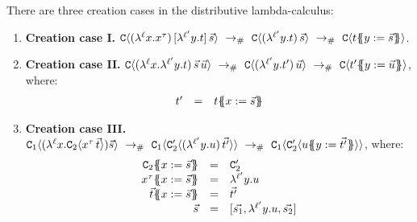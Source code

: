 \begin{lemma}[Creation]
There are three creation cases in the distributive lambda-calculus:
\begin{enumerate}
\item {\bf Creation case I.}
  $
    \con\of{ (\lamp{\lab}{\var}{\var^{\typ}})\,[\lamp{\labtwo}{\vartwo}{\tm}]\, \ls{\tmtwo}}
    \ \todist\ %
    \con\of{ (\lamp{\labtwo}{\vartwo}{\tm})\,\ls{\tmtwo} }
    \ \todist\ %
    \con\of{ \tm\sub{\vartwo}{\ls{\tmtwo}} }
  $.
\item {\bf Creation case II.}
  $
     \con\of{ (\lamp{\lab}{\var}{ \lamp{\labtwo}{\vartwo}{\tm} })\,\ls{\tmtwo}\,\ls{\tmthree} }
     \ \todist\ %
     \con\of{ (\lamp{\labtwo}{\vartwo}{\tm'})\,\ls{\tmthree} }
     \ \todist\ %
     \con\of{ \tm'\sub{\vartwo}{\ls{\tmthree}} }
  $, where:
  \[
     \begin{array}{rcl}
     t' & = & t\{\!\!\{x := \vec{s}\}\!\!\}
     \end{array}
  \]
\item {\bf Creation case III.}
  $
    \con_1\of{(\lamp{\lab}{\var}{\con_2\of{\var^{\typ}\,\ls{\tm}}})\ls{\tmtwo}}
    \ \todist\ %
    \con_1\of{\con'_2\of{(\lamp{\labtwo}{\vartwo}{\tmthree})\,\ls{\tm'}}}
    \ \todist\ %
    \con_1\of{\con'_2\of{\tmthree\sub{\vartwo}{\ls{\tm'}}}}
  $,
  where:
  \[
  \begin{array}{rcl}
    \con_2\sub{\var}{\ls{\tmtwo}}      & = & \con'_2 \\
    \var^{\typ}\sub{\var}{\ls{\tmtwo}} & = & \lamp{\labtwo}{\vartwo}{\tmthree} \\
    \ls{\tm}\sub{\var}{\ls{\tmtwo}}    & = & \ls{\tm'} \\
    \ls{\tmtwo}                        & = & [\ls{\tmtwo_1},\lamp{\labtwo}{\vartwo}{\tmthree},\ls{\tmtwo_2}] \\
  \end{array}
  \]
\end{enumerate}
\end{lemma}
